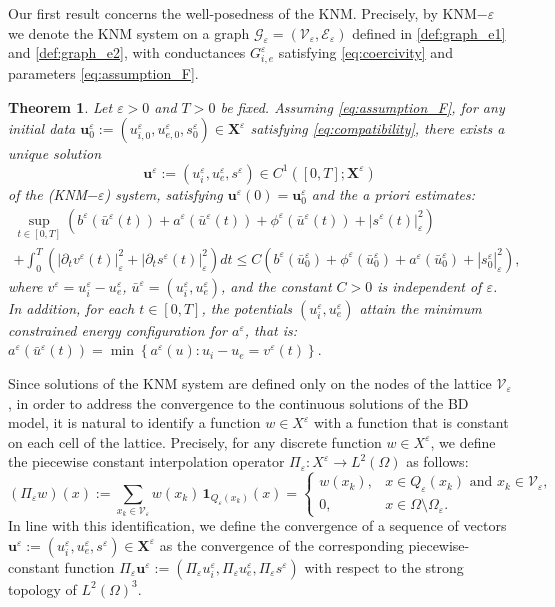 \documentclass[a4paper,11pt]{article}
\newtheorem{theorem}{Theorem}[section]
\theoremstyle{definition}
\numberwithin{equation}{section}
\newcommand{\e}{\varepsilon}
\renewcommand{\u}{\mathbf{u}}
\newcommand{\V}{\mathcal{V}}
\begin{document}
Our first result concerns the well-posedness of the KNM. Precisely, by KNM$-\e$ we denote the KNM system on a graph $\mathcal{G}_\e=(\V_\e,\mathcal{E_{\e}})$ defined in \eqref{def:graph_e1} and \eqref{def:graph_e2}, with conductances $G_{i,e}^\e$ satisfying \eqref{eq:coercivity} and parameters \eqref{eq:assumption_F}.
\begin{theorem}
	\label{th:wp-KNM}
	Let $\e>0$ and $T>0$ be fixed. Assuming \eqref{eq:assumption_F}, for any initial data $\u_0^\e:=(u_{i,0}^\e,u_{e,0}^\e,s_0^\e) \in  \mathbf{X}^\e$ satisfying \eqref{eq:compatibility}, there exists a unique solution
	\[
	\u^\e:=(u_i^\e,u_e^\e,s^\e)\in C^1([0,T]; \mathbf{X}^\e)
	\]
	of the (KNM$-\e$) system, satisfying $\u^\e(0)=\u_0^\e$ and the a priori estimates:
	\begin{equation}
		\label{apriori-estimate}
		\begin{aligned}
			\sup_{t \in [0,T]} \left( b^\e(\bar{u}^\e(t)) + a^\e(\bar{u}^\e(t)) +\phi^\e(\bar{u}^\e(t)) +  |s^\e(t)|^2_\e  \right) 
			\hspace{4cm} \\
			+ \int_0^T \left( |\partial_t v^\e(t)|_\e^2 + |\partial_t s^\e(t)|_\e^2 \right) dt 
			\leq C \left( b^\e(\bar{u}_0^\e) + \phi^\e(\bar{u}_0^\e) + a^\e(\bar{u}_0^\e) +|s_0^\e|^2_\e \right),
		\end{aligned}
	\end{equation}
	where $v^\e=u_i^\e-u_e^\e$, $\bar u^\e = (u_i^\e,u_e^\e)$, and the constant $C > 0$ is independent of $\e$. In addition, for each $t \in [0,T]$, the potentials $(u_i^\e, u_e^\e)$ attain the minimum constrained energy configuration for $a^\e$, that is: $a^\e(\bar{u}^\e(t)) = \min \left\{ a^\e({u}) : {u}_i - {u}_e = v^\e(t) \right\}.$
\end{theorem}

Since solutions of the KNM system are defined only on the nodes of the lattice $\V_\e$, in order to address the convergence to the continuous solutions of the BD model, it is natural to identify a function $w \in X^\e$ with a function that is constant on each cell of the lattice. Precisely, for any discrete function $w \in X^\e$, we define the piecewise constant interpolation operator $\Pi_\e : X^\e \to L^2(\Omega)$ as follows:
\begin{equation*}
	(\Pi_\e w)(x)
	:=
	\sum_{x_k\in \V_\e}
	w(x_k)\,\mathbf{1}_{Q_\e(x_k)}(x)=\begin{cases} 
		w(x_k), & x \in Q_\e(x_k) \,\,\text{and} \,\, x_k\in \V_\e, \\ 
		0, & x \in \Omega \setminus \Omega_\e. 
	\end{cases}
\end{equation*}
In line with this identification, we define the convergence of a sequence of vectors $\mathbf{u}^\e := (u_i^\e, u_e^\e, s^\e)\in \mathbf{X}^\e$ as the convergence of the corresponding piecewise-constant function $\Pi_\e\mathbf{u}^\e := (\Pi_\e u_i^\e, \Pi_\e u_e^\e, \Pi_\e s^\e)$ with respect to the strong topology of $L^2(\Omega)^3$.
\end{document}
